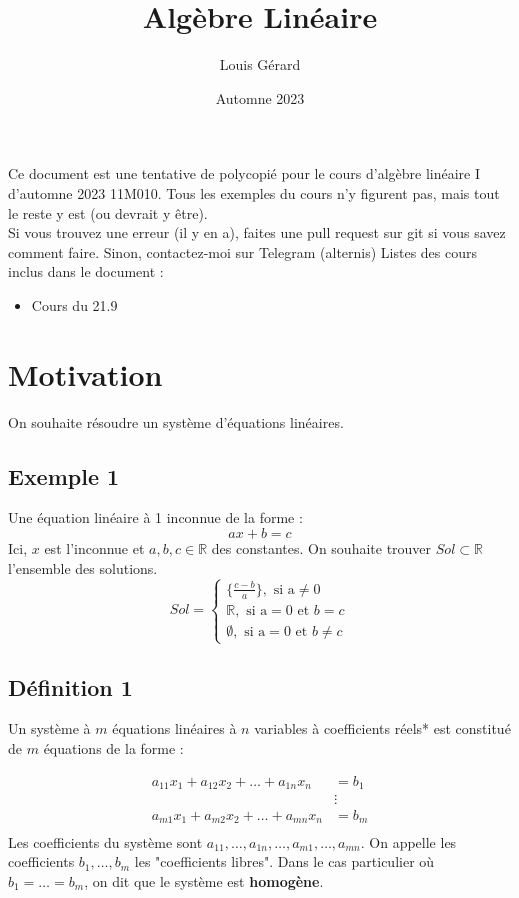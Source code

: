 \documentclass[12pt]{article}
\title{Algèbre Linéaire}
\author{Louis Gérard}
\date{Automne 2023}
\begin{document}
\maketitle

\newcommand{\R}{\mathbb{R}}
\newcommand{\K}{\mathrm{K}}
\newcommand{\C}{\mathbb{C}}
\newcommand{\zero}{\mathbb{0}}
\newcommand{\family}{\{v_i\}_{i\in I}}
\newcommand{\uv}{\{u,v\}}

Ce document est une tentative de polycopié pour le cours d'algèbre 
linéaire I d'automne 2023 11M010. Tous les exemples du cours n'y figurent pas, mais tout le reste y est (ou devrait y être).
\\
Si vous trouvez une erreur (il y en a), faites une pull request sur git si vous savez comment faire. Sinon, contactez-moi sur Telegram (alternis) 
Listes des cours inclus dans le document :
\begin{itemize}
    \item Cours du 21.9
\end{itemize}
\pagebreak
\tableofcontents
\pagebreak

\section*{Motivation}
On souhaite résoudre un système d'équations linéaires.
\subsection*{Exemple 1}
Une équation linéaire à 1 inconnue de la forme :
$$
ax+b=c
$$
Ici, $x$ est l'inconnue et $a,b,c \in \R$ des constantes. On souhaite trouver $Sol \subset \R$
l'ensemble des solutions.
$$
Sol = \begin{cases} \{\frac{c-b}{a}\}, \text{ si a} \neq 0 \\
     \R, \text{ si a}=0 \text{ et } b = c \\ 
    \emptyset, \text{ si a}=0 \text{ et } b \neq c
    \end{cases}
$$
\subsection*{Définition 1}
Un système à $m$ équations linéaires à $n$ variables à 
coefficients réels* est constitué de $m$ équations de la forme :

$$
\begin{aligned}
    a_{11}x_1 + a_{12}x_2 + \dots + a_{1n}x_n &=b_1 \\
    & \vdots \\
    a_{m1}x_1 + a_{m2}x_2 + \dots + a_{mn}x_n &=b_m \\
\end{aligned}
$$
Les coefficients du système sont $a_{11}, \dots, a_{1n}, \dots, a_{m1}, \dots, a_{mn}$.
On appelle les coefficients $b_1, \dots, b_m$ les "coefficients libres".
Dans le cas particulier où $b_1 = \dots = b_m$, on dit que le système est \textbf{homogène}.
\end{document}
